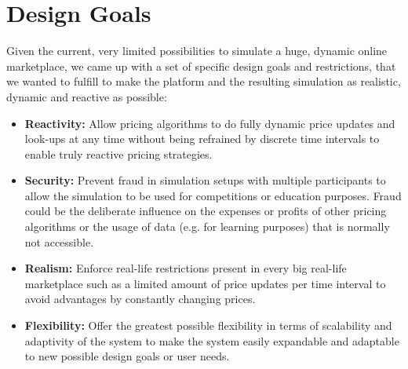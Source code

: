 \fi

\section{Design Goals}
\label{sec:Design_Goals}
%
Given the current, very limited possibilities to simulate a huge, dynamic online marketplace, we came up with a set of specific design goals and restrictions, that we wanted to fulfill to make the platform and the resulting simulation as realistic, dynamic and reactive as possible: 
\begin{itemize}
    \item \textbf{Reactivity:} Allow pricing algorithms to do fully dynamic price updates and look-ups at any time without being refrained by discrete time intervals to enable truly reactive pricing strategies.
    \item \textbf{Security:} Prevent fraud in simulation setups with multiple participants to allow the simulation to be used for competitions or education purposes. Fraud could be the deliberate influence on the expenses or profits of other pricing algorithms or the usage of data (e.g. for learning purposes) that is normally not accessible.
    \item \textbf{Realism:} Enforce real-life restrictions present in every big real-life marketplace such as a limited amount of price updates per time interval to avoid advantages by constantly changing prices.
    \item \textbf{Flexibility:} Offer the greatest possible flexibility in terms of scalability and adaptivity of the system to make the system easily expandable and adaptable to new possible design goals or user needs. 
\end{itemize}

